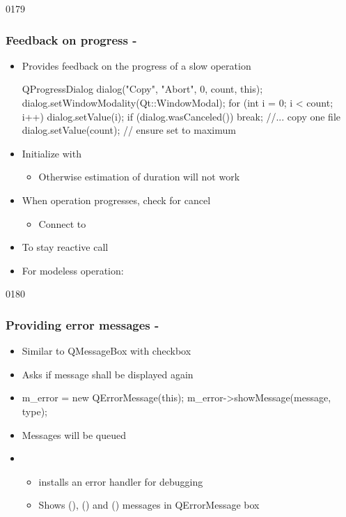 \begin{slide}[fragile]{0179}
\frametitle{Feedback on progress - }
\begin{itemize}
  \item Provides feedback on the progress of a slow operation
   \begin{cpp}
QProgressDialog dialog("Copy", "Abort", 0, count, this);
dialog.setWindowModality(Qt::WindowModal);
for (int i = 0; i < count; i++) {
  dialog.setValue(i);
  if (dialog.wasCanceled()) { break; }
  //... copy one file
}
dialog.setValue(count); // ensure set to maximum      
    \end{cpp}
  \item Initialize with 
    \begin{itemize}
    \item Otherwise estimation of duration will not work
    \end{itemize}
  \item When operation progresses, check for cancel
    \begin{itemize}
    \item Connect to 
    \end{itemize}
  \item To stay reactive call 
  \item For modeless operation: 
  \end{itemize}
\end{slide}

\begin{slide}[fragile]{0180}\frametitle{Providing error messages - }\label{qerrormessage}
  \begin{itemize}
  \item Similar to QMessageBox with checkbox
  \item Asks if message shall be displayed again
 \item[]
    \begin{cpp}
m_error = new QErrorMessage(this);
m_error->showMessage(message, type);
    \end{cpp}
\item Messages will be queued
  \item {}
    \begin{itemize}
   \item installs an error handler for debugging
    \item Shows (), () and
    () messages in QErrorMessage box
    \end{itemize}
\end{itemize}
\end{slide}

